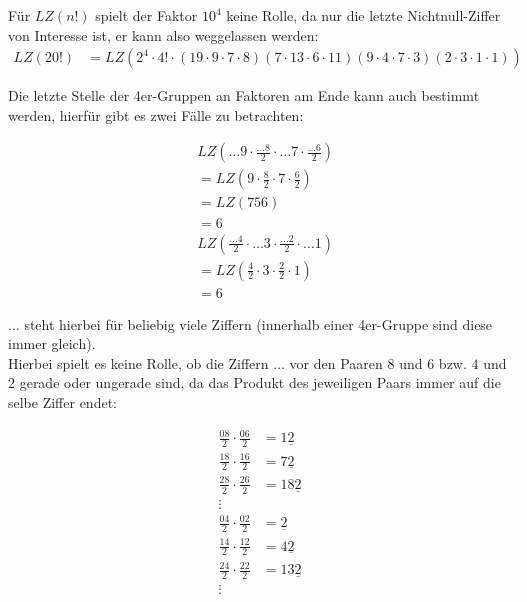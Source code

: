 \documentclass[12pt,a4paper,oneside]{article}
\begin{document}
Für $LZ(n!)$ spielt der Faktor $10^4$ keine Rolle, da nur die letzte Nichtnull-Ziffer von Interesse ist, er kann also weggelassen werden:
\begin{equation*}
	\begin{split}
		LZ(20!) &= LZ\left(2^4 \cdot 4! \cdot (19\cdot9\cdot7\cdot8)(7\cdot13\cdot6\cdot11)(9\cdot4\cdot7\cdot3)(2\cdot3\cdot1\cdot1)\right)
	\end{split}
\end{equation*}

Die letzte Stelle der 4er-Gruppen an Faktoren am Ende kann auch bestimmt werden, hierfür gibt es zwei Fälle zu betrachten:
\begin{multicols}{2}
	\noindent
	\begin{equation*}
		\begin{split}
			&LZ\left(\dots9 \cdot \frac{\dots8}{2} \cdot \dots7 \cdot \frac{\dots6}{2}\right) \\
			&= LZ\left(9\cdot\frac{8}{2}\cdot7\cdot\frac{6}{2}\right) \\
			&= LZ\left(756\right) \\
			&= 6
		\end{split}
	\end{equation*}
	\begin{equation*}
		\begin{split}
			&LZ\left(\frac{\dots4}{2} \cdot \dots3 \cdot \frac{\dots2}{2} \cdot \dots1\right) \\
			&= LZ\left(\frac{4}{2} \cdot 3 \cdot \frac{2}{2} \cdot 1\right) \\
			&= 6
		\end{split}
	\end{equation*}
\end{multicols}

$\dots$ steht hierbei für beliebig viele Ziffern (innerhalb einer 4er-Gruppe sind diese immer gleich).
\\[10pt]
Hierbei spielt es keine Rolle, ob die Ziffern $\dots$ vor den Paaren $8$ und $6$ bzw. $4$ und $2$ gerade oder ungerade sind, da das Produkt des jeweiligen Paars immer auf die selbe Ziffer endet:
\begin{multicols}{2}
	\noindent
	\begin{equation*}
		\begin{split}
			\frac{08}{2} \cdot \frac{06}{2} &= 1\underline{2} \\
			\frac{18}{2} \cdot \frac{16}{2} &= 7\underline{2} \\
			\frac{28}{2} \cdot \frac{26}{2} &= 18\underline{2} \\
			\vdots
		\end{split}
	\end{equation*}
	\begin{equation*}
		\begin{split}
			\frac{04}{2} \cdot \frac{02}{2} &= \underline{2} \\
			\frac{14}{2} \cdot \frac{12}{2} &= 4\underline{2} \\
			\frac{24}{2} \cdot \frac{22}{2} &= 13\underline{2} \\
			\vdots
		\end{split}
	\end{equation*}
\end{multicols}
\end{document}
